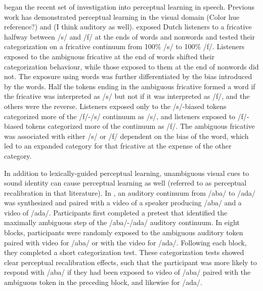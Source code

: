 \citet{Norris2003} began the recent set of investigation into perceptual learning in speech. Previous work has demonstrated perceptual learning in the visual domain (Color hue reference?) and (I think auditory as well).  
\citet{Norris2003} exposed Dutch listeners to a fricative halfway between /s/ and /f/ at the ends of words and nonwords and tested their categorization on a fricative continuum from 100\% /s/ to 100\% /f/. 
 Listeners exposed to the ambiguous fricative at the end of words shifted their categorization behaviour, while those exposed to them at the end of nonwords did not.  The exposure using words was further differentiated by the bias introduced by the words.  
Half the tokens ending in the ambiguous fricative formed a word if the fricative was interpreted as /s/ but not if it was interpreted as /f/, and the others were the reverse.  
Listeners exposed only to the /s/-biased tokens categorized more of the /f/-/s/ continuum as /s/, and listeners exposed to /f/-biased tokens categorized more of the continuum as /f/.  
The ambiguous fricative was associated with either /s/ or /f/ dependent on the bias of the word, which led to an expanded category for that fricative at the expense of the other category.








In addition to lexically-guided perceptual learning, unambiguous visual cues to sound identity can cause perceptual learning as well (referred to as perceptual recalibration in that literature).
In \citet{Bertelson2003}, an auditory continuum from /aba/ to /ada/ was synthesized and paired with a video of a speaker producing /aba/ and a video of /ada/.  
Participants first completed a pretest that identified the maximally ambiguous step of the /aba/-/ada/ auditory continuum. 
 In eight blocks, participants were randomly exposed to the ambiguous auditory token paired with video for /aba/ or with the video for /ada/.  Following each block, they completed a short categorization test.  
These categorization tests showed clear perceptual recalibration effects, such that the participant was more likely to respond with /aba/ if they had been exposed to video of /aba/ paired with the ambiguous token in the preceding block, and likewise for /ada/.

